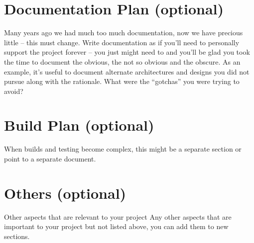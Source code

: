\section{Documentation Plan (optional)}  
Many years ago we had much too much documentation, now we have precious little – 
this must change.  Write documentation as if you’ll need to personally support the 
project forever – you just might need to and you’ll be glad you took the time to document the obvious, the not so obvious and the obscure.  As an example, it’s useful to document alternate architectures and designs you did not pursue along with the rationale.  What were the “gotchas” you were trying to avoid?   

\section{Build Plan (optional)} 
When builds and testing become complex, this might be a separate section or point to a 
separate document. 

\section{Others (optional)}
Other aspects that are relevant to your project
Any other aspects that are important to your project but not listed above, you can add them to new sections.
